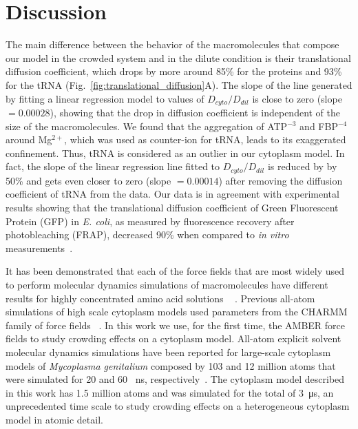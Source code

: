 \documentclass[journal=jacsat,manuscript=article]{achemso}
\begin{document}
 
 
 
 
 
 
 
 
 
 
 
 
 
\section*{Discussion}\label{sec:dissc}


The main difference between the behavior of the macromolecules that compose our model in the crowded system and in the dilute condition is their translational diffusion coefficient, which drops by more around 85\% for the proteins and 93\% for the tRNA (Fig.~\ref{fig:translational_diffusion}A). The slope of the line generated by fitting a linear regression model to values of $D_{cyto}/D_{dil}$ is close to zero (slope $= 0.00028$), showing that the drop in diffusion coefficient is independent of the size of the macromolecules. We found that the aggregation of ATP$^{-3}$ and FBP$^{-4}$ around Mg$^{2+}$, which was used as counter-ion for tRNA, leads to its exaggerated confinement. Thus, tRNA is considered as an outlier in our cytoplasm model. In fact, the slope of the linear regression line fitted to $D_{cyto}/D_{dil}$ is reduced by by 50\% and gets even closer to zero (slope $= 0.00014$) after removing the diffusion coefficient of tRNA from the data. Our data is in agreement with experimental results showing that the translational diffusion coefficient of Green Fluorescent Protein (GFP) in {\em E. coli}, as measured by fluorescence recovery after photobleaching (FRAP), decreased 90\% when compared to {\em in vitro} measurements~\cite{Elowitz1999,Konopka2006}.



It has been demonstrated that each of the force fields that are most widely used to perform molecular dynamics simulations of macromolecules have different results for highly concentrated amino acid solutions ~ \cite{andrews2013molecular}. Previous all-atom simulations of high scale cytoplasm models used parameters from the CHARMM family of force fields ~\cite{yu2016biomolecular,mcguffee2010diffusion}. In this work we use, for the first time, the AMBER force fields to study crowding effects on a cytoplasm model. All-atom explicit solvent molecular dynamics simulations have been reported for large-scale cytoplasm models of \textit{Mycoplasma genitalium} composed by 103 and 12 million atoms that were simulated for 20 and 60 \SI{}{\nano\second}, respectively~\cite{yu2016biomolecular}. The cytoplasm model described in this work has 1.5 million atoms and was simulated for the total of \SI{3}{\micro\second}, an unprecedented time scale to study crowding effects on a heterogeneous cytoplasm model in atomic detail.
\end{document}
